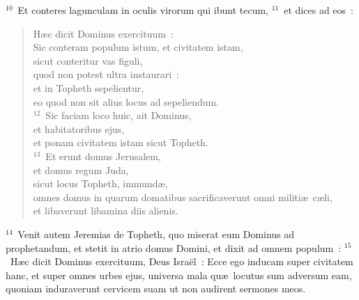 ${}^{10}$~Et conteres lagunculam in oculis virorum qui ibunt tecum,
${}^{11}$~et dices ad eos~: \begin{flushleft}\begin{verse}H\ae c dicit Dominus exercituum~:\\ Sic conteram populum istum, et civitatem istam,\\ sicut conteritur vas figuli,\\ quod non potest ultra instaurari~:\\ et in Topheth sepelientur,\\ eo quod non sit alius locus ad sepeliendum.\\
${}^{12}$~Sic faciam loco huic, ait Dominus,\\ et habitatoribus ejus,\\ et ponam civitatem istam sicut Topheth.\\
${}^{13}$~Et erunt domus Jerusalem,\\ et domus regum Juda,\\ sicut locus Topheth, immund\ae ,\\ omnes domus in quarum domatibus sacrificaverunt omni militi\ae\ c\ae li,\\ et libaverunt libamina diis alienis.\end{verse}\end{flushleft}


${}^{14}$~Venit autem Jeremias de Topheth, quo miserat eum Dominus ad prophetandum, et stetit in atrio domus Domini, et dixit ad omnem populum~:
${}^{15}$~H\ae c dicit Dominus exercituum, Deus Isra\"el~: Ecce ego inducam super civitatem hanc, et super omnes urbes ejus, universa mala qu\ae\ locutus sum adversum eam, quoniam induraverunt cervicem suam ut non audirent sermones meos.

